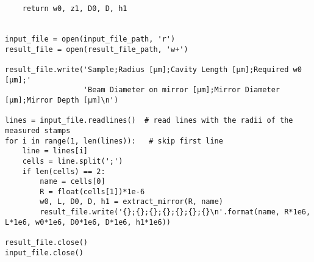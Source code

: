 \begin{lstlisting}
    return w0, z1, D0, D, h1


input_file = open(input_file_path, 'r')
result_file = open(result_file_path, 'w+')

result_file.write('Sample;Radius [µm];Cavity Length [µm];Required w0 [µm];'
                  'Beam Diameter on mirror [µm];Mirror Diameter [µm];Mirror Depth [µm]\n')

lines = input_file.readlines()  # read lines with the radii of the measured stamps
for i in range(1, len(lines)):   # skip first line
    line = lines[i]
    cells = line.split(';')
    if len(cells) == 2:
        name = cells[0]
        R = float(cells[1])*1e-6
        w0, L, D0, D, h1 = extract_mirror(R, name)
        result_file.write('{};{};{};{};{};{};{}\n'.format(name, R*1e6, L*1e6, w0*1e6, D0*1e6, D*1e6, h1*1e6))

result_file.close()
input_file.close()
\end{lstlisting}

